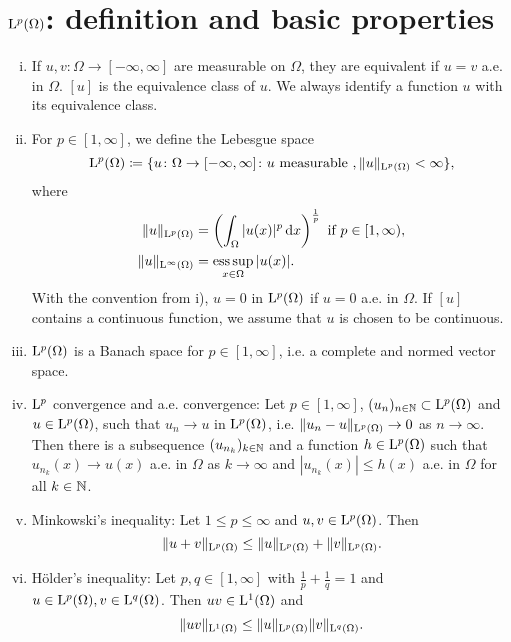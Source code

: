 \section{\texorpdfstring{$\mathrm{L}^p(\Omega)$}{L\textasciicircum p(Omega)}: definition and basic properties}
\label{sec:lpBasics}
\begin{enumerate}[i)]
  \item If $u,v \colon \Omega \to [-\infty,\infty]$ are measurable on $\Omega$, they are equivalent if $u = v$ a.e. in $\Omega$.
    $[u]$ is the equivalence class of $u$.
    We always identify a function $u$ with its equivalence class.
  \item For $p \in [1,\infty]$, we define the Lebesgue space
    $$
    \mathrm{L}^p(\Omega) \coloneqq \{ u \colon \Omega \to [-\infty,\infty] \colon u \text{ measurable }, \|u\|_{\mathrm{L}^p(\Omega)} < \infty \},
    $$
    where
    \begin{align*}
      \|u\|_{\Ell^p(\Omega)} &= \left( \int_\Omega |u(x)|^p \d x \right)^{\frac{1}{p}} \text{ if } p \in [1,\infty), \\
        \|u\|_{\Ell^\infty(\Omega)} &= \esssup_{x \in \Omega} |u(x)|.
    \end{align*}
    With the convention from i), $u = 0$ in $\mathrm{L}^p(\Omega)$ if $u = 0$ a.e. in $\Omega$.
    If $[u]$ contains a continuous function, we assume that $u$ is chosen to be continuous.
  \item $\mathrm{L}^p(\Omega)$ is a Banach space for $p \in [1,\infty]$, i.e. a complete and normed vector space.
  \item $\mathrm{L}^p$ convergence and a.e. convergence: Let $p \in [1,\infty]$, $(u_n)_{n \in \mathbb{N}} \subset \mathrm{L}^p(\Omega)$ and $u \in \mathrm{L}^p(\Omega)$, such that $u_n \to u$ in $\mathrm{L}^p(\Omega)$, i.e. $\|u_n - u\|_{\mathrm{L}^p(\Omega)} \to 0$ as $n \to \infty$.
    Then there is a subsequence $(u_{n_k})_{k \in \mathbb{N}}$ and a function $h \in \mathrm{L}^p(\Omega)$ such that $u_{n_k}(x) \to u(x)$ a.e. in $\Omega$ as $k \to \infty$ and $|u_{n_k}(x)| \leq h(x)$ a.e. in $\Omega$ for all $k \in \mathbb{N}$.
  \item Minkowski's inequality: Let $1 \leq p \leq \infty$ and $u,v \in \mathrm{L}^p(\Omega)$.
    Then
    $$
    \|u + v\|_{\mathrm{L}^p(\Omega)} \leq \|u\|_{\mathrm{L}^p(\Omega)}+ \|v\|_{\mathrm{L}^p(\Omega)}.
    $$
  \item Hölder's inequality: Let $p,q \in [1,\infty]$ with $\frac{1}{p} + \frac{1}{q} = 1$ and $u \in \mathrm{L}^p(\Omega), v \in \mathrm{L}^q(\Omega)$. 
    Then $uv \in \mathrm{L}^1(\Omega)$ and
    $$
    \|uv\|_{\mathrm{L}^1(\Omega)} \leq \|u\|_{\mathrm{L}^p(\Omega)} \|v\|_{\mathrm{L}^q(\Omega)}.
$$
\end{enumerate}
